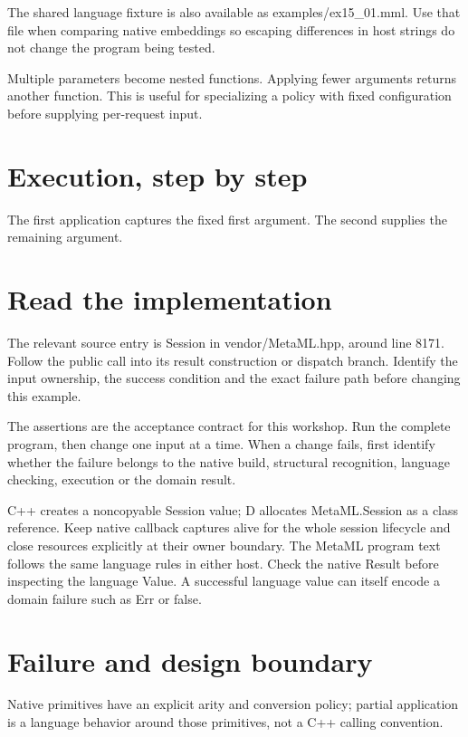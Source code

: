 The shared language fixture is also available as examples/ex15\_01.mml. Use that file when comparing native embeddings so escaping differences in host strings do not change the program being tested.

\clearpage
{}
Multiple parameters become nested functions. Applying fewer arguments returns another function. This is useful for specializing a policy with fixed configuration before supplying per-request input.


\section*{Execution, step by step}
The first application captures the fixed first argument. The second supplies the remaining argument.

\section*{Read the implementation}
The relevant source entry is Session in vendor/MetaML.hpp, around line 8171. Follow the public call into its result construction or dispatch branch. Identify the input ownership, the success condition and the exact failure path before changing this example.

The assertions are the acceptance contract for this workshop. Run the complete program, then change one input at a time. When a change fails, first identify whether the failure belongs to the native build, structural recognition, language checking, execution or the domain result.

\clearpage
{}
C++ creates a noncopyable Session value; D allocates MetaML.Session as a class reference. Keep native callback captures alive for the whole session lifecycle and close resources explicitly at their owner boundary. The MetaML program text follows the same language rules in either host. Check the native Result before inspecting the language Value. A successful language value can itself encode a domain failure such as Err or false.


\section*{Failure and design boundary}
Native primitives have an explicit arity and conversion policy; partial application is a language behavior around those primitives, not a C++ calling convention.

